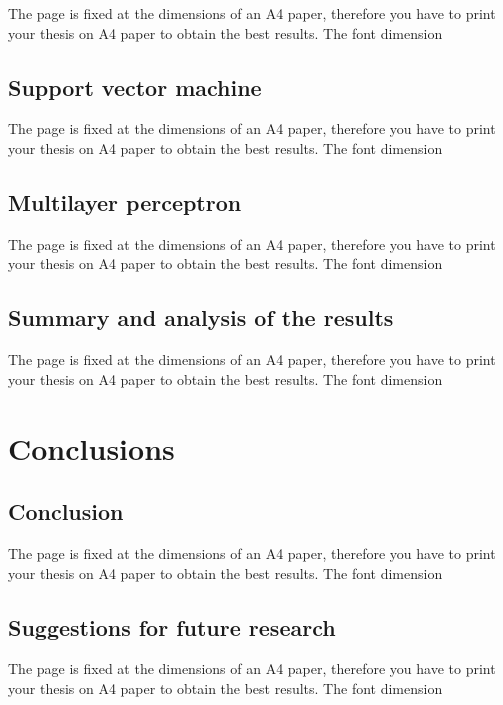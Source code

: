 \documentclass[LaM,binding=0.6cm, english]{sapthesis}
\begin{document}
The page is fixed at the dimensions of an A4 paper, therefore you have to print your thesis on A4 paper to obtain the best results. The font dimension

\section{Support vector machine}

The page is fixed at the dimensions of an A4 paper, therefore you have to print your thesis on A4 paper to obtain the best results. The font dimension

\section{Multilayer perceptron}

The page is fixed at the dimensions of an A4 paper, therefore you have to print your thesis on A4 paper to obtain the best results. The font dimension

\section{Summary and analysis of the results}

The page is fixed at the dimensions of an A4 paper, therefore you have to print your thesis on A4 paper to obtain the best results. The font dimension

\chapter{Conclusions}

\section{Conclusion}

The page is fixed at the dimensions of an A4 paper, therefore you have to print your thesis on A4 paper to obtain the best results. The font dimension

\section{Suggestions for future research}

The page is fixed at the dimensions of an A4 paper, therefore you have to print your thesis on A4 paper to obtain the best results. The font dimension

\backmatter
\end{document}
